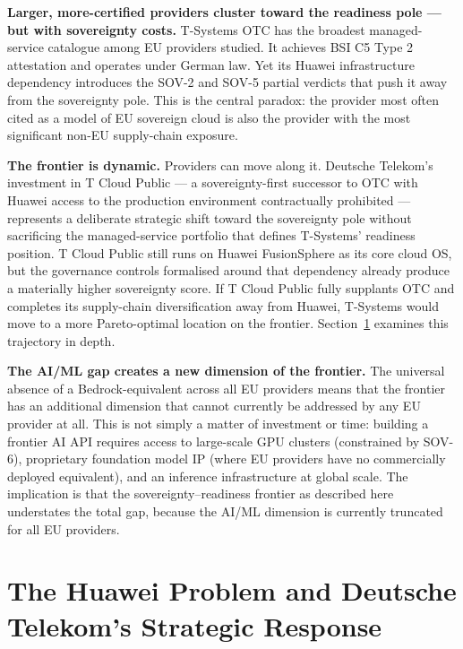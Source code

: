 \textbf{Larger, more-certified providers cluster toward the readiness pole — but with sovereignty costs.} T-Systems OTC has the broadest managed-service catalogue among EU providers studied. It achieves BSI C5 Type 2 attestation and operates under German law. Yet its Huawei infrastructure dependency introduces the SOV-2 and SOV-5 partial verdicts that push it away from the sovereignty pole. This is the central paradox: the provider most often cited as a model of EU sovereign cloud is also the provider with the most significant non-EU supply-chain exposure.

\textbf{The frontier is dynamic.} Providers can move along it. Deutsche Telekom's investment in T Cloud Public — a sovereignty-first successor to OTC with Huawei access to the production environment contractually prohibited — represents a deliberate strategic shift toward the sovereignty pole without sacrificing the managed-service portfolio that defines T-Systems' readiness position. T Cloud Public still runs on Huawei FusionSphere as its core cloud OS, but the governance controls formalised around that dependency already produce a materially higher sovereignty score. If T Cloud Public fully supplants OTC and completes its supply-chain diversification away from Huawei, T-Systems would move to a more Pareto-optimal location on the frontier. Section~\ref{sec:huawei_problem} examines this trajectory in depth.

\textbf{The AI/ML gap creates a new dimension of the frontier.} The universal absence of a Bedrock-equivalent across all EU providers means that the frontier has an additional dimension that cannot currently be addressed by any EU provider at all. This is not simply a matter of investment or time: building a frontier AI API requires access to large-scale GPU clusters (constrained by SOV-6), proprietary foundation model IP (where EU providers have no commercially deployed equivalent), and an inference infrastructure at global scale. The implication is that the sovereignty--readiness frontier as described here understates the total gap, because the AI/ML dimension is currently truncated for all EU providers.

\section{The Huawei Problem and Deutsche Telekom's Strategic Response}
\label{sec:huawei_problem}

